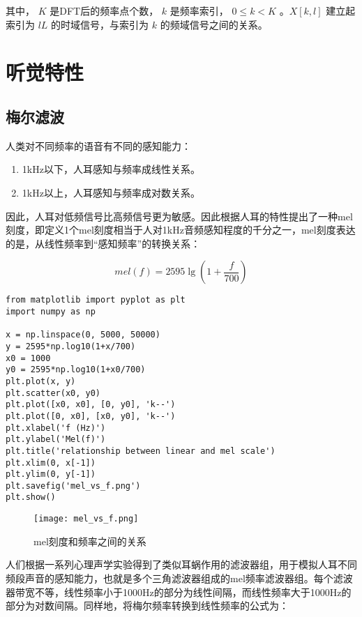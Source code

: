 \documentclass[cn,10pt,math=newtx,citestyle=gb7714-2015,bibstyle=gb7714-2015]{elegantbook}
\begin{document}
其中， $K$ 是DFT后的频率点个数， $k$ 是频率索引， $0\leq k< K$ 。$X[k,l]$ 建立起索引为 $lL$ 的时域信号，与索引为 $k$ 的频域信号之间的关系。

\section{听觉特性}

\subsection{梅尔滤波}

人类对不同频率的语音有不同的感知能力：

\begin{enumerate}
  \item 1kHz以下，人耳感知与频率成线性关系。
  \item 1kHz以上，人耳感知与频率成对数关系。
\end{enumerate}

因此，人耳对低频信号比高频信号更为敏感。因此根据人耳的特性提出了一种mel刻度，即定义1个mel刻度相当于人对1kHz音频感知程度的千分之一，mel刻度表达的是，从线性频率到“感知频率”的转换关系：

\begin{equation}
  mel(f)=2595\mathop{lg}(1+\frac{f}{700})
\end{equation}

\begin{lstlisting}
from matplotlib import pyplot as plt
import numpy as np

x = np.linspace(0, 5000, 50000)
y = 2595*np.log10(1+x/700)
x0 = 1000
y0 = 2595*np.log10(1+x0/700)
plt.plot(x, y)
plt.scatter(x0, y0)
plt.plot([x0, x0], [0, y0], 'k--')
plt.plot([0, x0], [x0, y0], 'k--')
plt.xlabel('f (Hz)')
plt.ylabel('Mel(f)')
plt.title('relationship between linear and mel scale')
plt.xlim(0, x[-1])
plt.ylim(0, y[-1])
plt.savefig('mel_vs_f.png')
plt.show()
\end{lstlisting}

\begin{figure}[htbp]
  \centering
  \texttt{[image: mel\_vs\_f.png]}
  \caption{mel刻度和频率之间的关系 \label{fig:mel_vs_f}}
\end{figure}

人们根据一系列心理声学实验得到了类似耳蜗作用的滤波器组，用于模拟人耳不同频段声音的感知能力，也就是多个三角滤波器组成的mel频率滤波器组。每个滤波器带宽不等，线性频率小于1000Hz的部分为线性间隔，而线性频率大于1000Hz的部分为对数间隔。同样地，将梅尔频率转换到线性频率的公式为：
\end{document}
